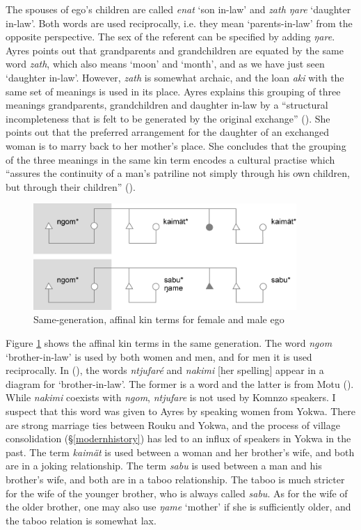 The spouses of ego's children are called \emph{enat} `son in-law' and \emph{zath ŋare} `daughter in-law'. Both words are used reciprocally, i.e. they mean `parents-in-law' from the opposite perspective. The sex of the referent can be specified by adding \emph{ŋare}. Ayres points out that grandparents and grandchildren are equated by the same word \emph{zath}, which also means `moon' and `month', and as we have just seen `daughter in-law'. However, \emph{zath} is somewhat archaic, and the  loan \emph{aki} with the same set of meanings is used in its place. Ayres explains this grouping of three meanings \textendash{} grandparents, grandchildren and daughter in-law \textendash{} by a ``structural incompleteness that is felt to be generated by the original exchange'' (\citeyear[226]{Ayres:ws}). She points out that the preferred arrangement for the daughter of an exchanged woman is to marry back to her mother's place. She concludes that the grouping of the three meanings in the same kin term encodes a cultural practise which ``assures the continuity of a man's patriline not simply through his own children, but through their children'' (\citeyear[227]{Ayres:ws}).

\begin{figure}
	\includegraphics[width=10cm]{figures/kinship2.png}
	\caption[Same-generation, affinal kin terms for female and male ego]{Same-generation, affinal kin terms for female and male ego}
	\label{fig:kinship2}
\end{figure}%

Figure \ref{fig:kinship2} shows the affinal kin terms in the same generation. The word \emph{ngom} `brother-in-law' is used by both women and men, and for men it is used reciprocally. In (\citealt[214]{Ayres:ws}), the words \emph{ntjufaré} and \emph{nakimi} [her spelling] appear in a  diagram for `brother-in-law'. The former is a  word and the latter is from Motu (\citealt[107]{Turnerlister:1935motu}). While \emph{nakimi} coexists with \emph{ngom}, \emph{ntjufare} is not used by Komnzo speakers. I suspect that this word was given to Ayres by  speaking women from Yokwa. There are strong marriage ties between Rouku and Yokwa, and the process of village consolidation ({\S}\ref{modernhistory}) has led to an influx of  speakers in Yokwa in the past. The term \emph{kaimät} is used between a woman and her brother's wife, and both are in a joking relationship. The term \emph{sabu} is used between a man and his brother's wife, and both are in a taboo relationship. The taboo is much stricter for the wife of the younger brother, who is always called \emph{sabu}. As for the wife of the older brother, one may also use \emph{ŋame} `mother' if she is sufficiently older, and the taboo relation is somewhat lax.

